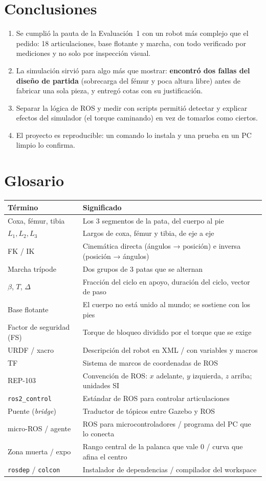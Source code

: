 \documentclass[11pt,a4paper]{article}
\newcommand{\seccion}[1]{\Needspace{18\baselineskip}\section{#1}}
\begin{document}
\seccion{Conclusiones}

\begin{enumerate}
  \item Se cumplió la pauta de la Evaluación~1 con un robot más complejo que
  el pedido: 18 articulaciones, base flotante y marcha, con todo verificado
  por mediciones y no solo por inspección visual.
  \item La simulación sirvió para algo más que mostrar: \textbf{encontró dos
  fallas del diseño de partida} (sobrecarga del fémur y poca altura libre)
  antes de fabricar una sola pieza, y entregó cotas con su justificación.
  \item Separar la lógica de ROS y medir con scripts permitió detectar y
  explicar efectos del simulador (el torque caminando) en vez de tomarlos
  como ciertos.
  \item El proyecto es reproducible: un comando lo instala y una prueba en un
  PC limpio lo confirma.
\end{enumerate}

\seccion{Glosario}

\begin{tabularx}{\linewidth}{@{}lY@{}}
\toprule
\textbf{Término} & \textbf{Significado}\\\midrule
Coxa, fémur, tibia & Los 3 segmentos de la pata, del cuerpo al pie\\
$L_1, L_2, L_3$ & Largos de coxa, fémur y tibia, de eje a eje\\
FK / IK & Cinemática directa (ángulos → posición) e inversa (posición → ángulos)\\
Marcha trípode & Dos grupos de 3 patas que se alternan\\
$\beta$, $T$, $\Delta$ & Fracción del ciclo en apoyo, duración del ciclo, vector de paso\\
Base flotante & El cuerpo no está unido al mundo; se sostiene con los pies\\
Factor de seguridad (FS) & Torque de bloqueo dividido por el torque que se exige\\
URDF / xacro & Descripción del robot en XML / con variables y macros\\
TF & Sistema de marcos de coordenadas de ROS\\
REP-103 & Convención de ROS: $x$ adelante, $y$ izquierda, $z$ arriba; unidades SI\\
\texttt{ros2\_control} & Estándar de ROS para controlar articulaciones\\
Puente (\emph{bridge}) & Traductor de tópicos entre Gazebo y ROS\\
micro-ROS / agente & ROS para microcontroladores / programa del PC que lo conecta\\
Zona muerta / expo & Rango central de la palanca que vale 0 / curva que afina el centro\\
\texttt{rosdep} / \texttt{colcon} & Instalador de dependencias / compilador del workspace\\
\bottomrule
\end{tabularx}
\end{document}
